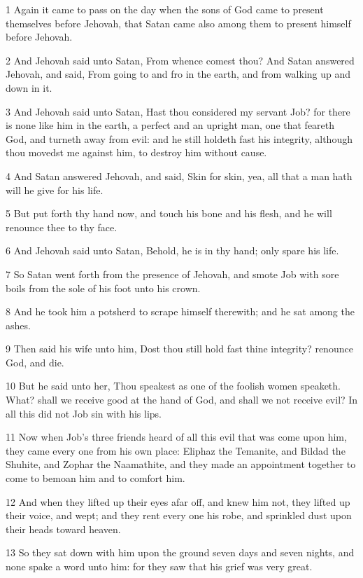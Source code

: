 \par 1 Again it came to pass on the day when the sons of God came to present themselves before Jehovah, that Satan came also among them to present himself before Jehovah.
\par 2 And Jehovah said unto Satan, From whence comest thou? And Satan answered Jehovah, and said, From going to and fro in the earth, and from walking up and down in it.
\par 3 And Jehovah said unto Satan, Hast thou considered my servant Job? for there is none like him in the earth, a perfect and an upright man, one that feareth God, and turneth away from evil: and he still holdeth fast his integrity, although thou movedst me against him, to destroy him without cause.
\par 4 And Satan answered Jehovah, and said, Skin for skin, yea, all that a man hath will he give for his life.
\par 5 But put forth thy hand now, and touch his bone and his flesh, and he will renounce thee to thy face.
\par 6 And Jehovah said unto Satan, Behold, he is in thy hand; only spare his life.
\par 7 So Satan went forth from the presence of Jehovah, and smote Job with sore boils from the sole of his foot unto his crown.
\par 8 And he took him a potsherd to scrape himself therewith; and he sat among the ashes.
\par 9 Then said his wife unto him, Dost thou still hold fast thine integrity? renounce God, and die.
\par 10 But he said unto her, Thou speakest as one of the foolish women speaketh. What? shall we receive good at the hand of God, and shall we not receive evil? In all this did not Job sin with his lips.
\par 11 Now when Job's three friends heard of all this evil that was come upon him, they came every one from his own place: Eliphaz the Temanite, and Bildad the Shuhite, and Zophar the Naamathite, and they made an appointment together to come to bemoan him and to comfort him.
\par 12 And when they lifted up their eyes afar off, and knew him not, they lifted up their voice, and wept; and they rent every one his robe, and sprinkled dust upon their heads toward heaven.
\par 13 So they sat down with him upon the ground seven days and seven nights, and none spake a word unto him: for they saw that his grief was very great.

